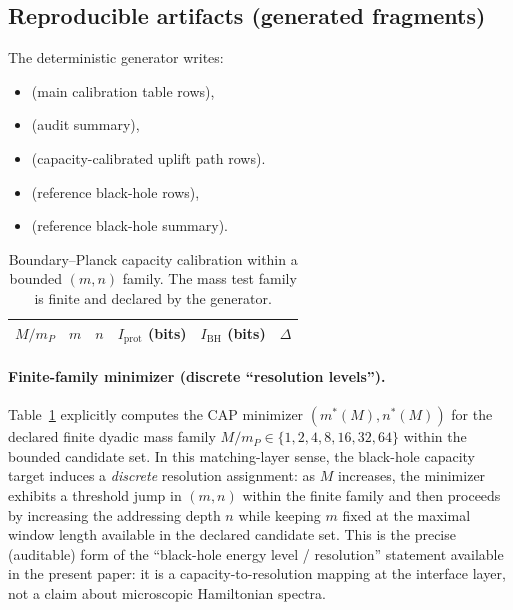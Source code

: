 \subsection{Reproducible artifacts (generated fragments)}
\label{subsec:bh_capacity_generated}

\AuditTag The deterministic generator  writes:
\begin{itemize}
\item {} (main calibration table rows),
\item {} (audit summary),
\item {} (capacity-calibrated uplift path rows).
\item {} (reference black-hole rows),
\item {} (reference black-hole summary).
\end{itemize}

\begin{table}[t]
\centering
\scriptsize
\setlength{\tabcolsep}{6pt}
\renewcommand{\arraystretch}{1.15}
\begin{tabular}{r r r r r r}
\toprule
$M/m_P$ & $m$ & $n$ & $I_{\mathrm{prot}}$ (bits) & $I_{\mathrm{BH}}$ (bits) & $\Delta$ \\
\midrule
%
\end{tabular}
\caption{Boundary--Planck capacity calibration within a bounded $(m,n)$ family. The mass test family is finite and declared by the generator.}
\label{tab:bh_planck_capacity_calibration}
\end{table}

\paragraph{Finite-family minimizer (discrete ``resolution levels'').}
\AuditTag Table~\ref{tab:bh_planck_capacity_calibration} explicitly computes the CAP minimizer $(m^\ast(M),n^\ast(M))$ for the declared finite dyadic mass family $M/m_P\in\{1,2,4,8,16,32,64\}$ within the bounded candidate set.
In this matching-layer sense, the black-hole capacity target induces a \emph{discrete} resolution assignment: as $M$ increases, the minimizer exhibits a threshold jump in $(m,n)$ within the finite family and then proceeds by increasing the addressing depth $n$ while keeping $m$ fixed at the maximal window length available in the declared candidate set.
This is the precise (auditable) form of the ``black-hole energy level / resolution'' statement available in the present paper: it is a capacity-to-resolution mapping at the interface layer, not a claim about microscopic Hamiltonian spectra.

